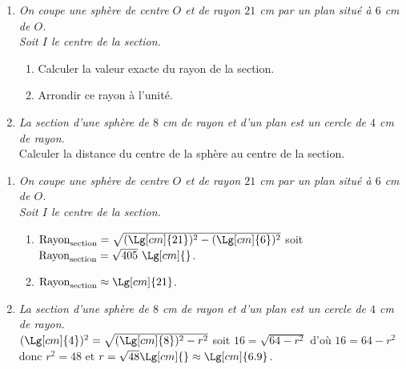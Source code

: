 \begin{methode*1}[Applications]
    \exercice
    \begin{enumerate}
        \item \textit{On coupe une sphère de centre $O$ et de rayon $21$ cm par un plan situé à $6$ cm de $O$.\\Soit $I$ le centre de la section.}
        \begin{enumerate}
            \item Calculer la valeur exacte du rayon de la section.
            \item Arrondir ce rayon à l'unité.
        \end{enumerate}
        \item \textit{La section d'une sphère de $8$ cm de rayon et d'un plan est un cercle de $4$ cm de rayon.}\\
        Calculer la distance du centre de la sphère au centre de la section.
    \end{enumerate}
    \correction
    \begin{enumerate}
        \item \textit{On coupe une sphère de centre $O$ et de rayon $21$ cm par un plan situé à $6$ cm de $O$.\\Soit $I$ le centre de la section.}
        \begin{enumerate}
            \item $\text{Rayon}_{\text{section}}=\sqrt{(\Lg[cm]{21})^2-(\Lg[cm]{6})^2}$ soit $\text{Rayon}_{\text{section}}=\sqrt{405}~\Lg[cm]{}$.
            \item $\text{Rayon}_{\text{section}}\approx\Lg[cm]{21}$.
        \end{enumerate}
        \item \textit{La section d'une sphère de $8$ cm de rayon et d'un plan est un cercle de $4$ cm de rayon.}\\
        $(\Lg[cm]{4})^2=\sqrt{(\Lg[cm]{8})^2-r^2}$ soit $16=\sqrt{64-r^2}$ d'où $16=64-r^2$ donc $r^2=48$ et $r=\sqrt{48}\Lg[cm]{}\approx\Lg[cm]{6.9}$.
    \end{enumerate}
\end{methode*1}


